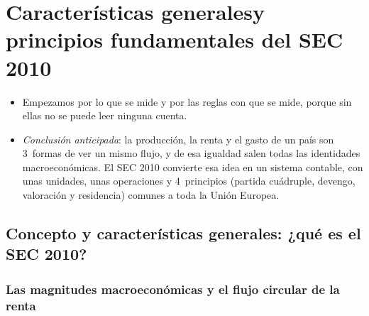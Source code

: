 \documentclass[11pt]{article}
\begin{document}
\section{Características generales\cortetitulo y principios fundamentales del SEC 2010}\label{sec:sec2010}

\begin{itemize}
\item Empezamos por lo que se mide y por las reglas con que se mide, porque sin ellas no se puede leer ninguna cuenta.
\item \emph{Conclusión anticipada}: la producción, la renta y el gasto de un país son 3~formas de ver un mismo flujo, y de esa igualdad salen todas las identidades macroeconómicas. El SEC 2010 convierte esa idea en un sistema contable, con unas unidades, unas operaciones y 4~principios (partida cuádruple, devengo, valoración y residencia) comunes a toda la Unión Europea.
\end{itemize}

\subsection{Concepto y características generales: ¿qué es el SEC 2010?}\label{sec:concepto}

\subsubsection{Las magnitudes macroeconómicas y el flujo circular de la renta}\label{sec:magnitudes}
\end{document}
